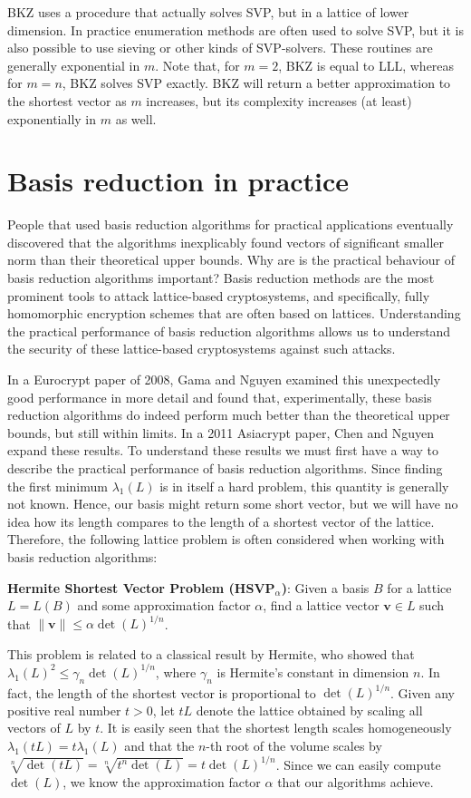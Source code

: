 \documentclass{article}[11pt]
\newcommand{\bfv}{\mathbf{v}}
\begin{document}
BKZ uses a procedure that actually solves SVP, but in a lattice of lower dimension. In practice enumeration methods are often used to solve SVP, but it is also possible to use sieving or other kinds of SVP-solvers. These routines are generally exponential in $m$. Note that, for $m=2$, BKZ is equal to LLL, whereas for $m=n$, BKZ solves SVP exactly. BKZ will return a better approximation to the shortest vector as $m$ increases, but its complexity increases (at least) exponentially in $m$ as well.

\section*{Basis reduction in practice}
People that used basis reduction algorithms for practical applications eventually discovered that the algorithms inexplicably found vectors of significant smaller norm than their theoretical upper bounds. Why are is the practical behaviour of basis reduction algorithms important? Basis reduction methods are the most prominent tools to attack lattice-based cryptosystems, and specifically, fully homomorphic encryption schemes that are often based on lattices. Understanding the practical performance of basis reduction algorithms allows us to understand the security of these lattice-based cryptosystems against such attacks. 

In a Eurocrypt paper of 2008, Gama and Nguyen examined this unexpectedly good performance in more detail and found that, experimentally, these basis reduction algorithms do indeed perform much better than the theoretical upper bounds, but still within limits. In a 2011 Asiacrypt paper, Chen and Nguyen expand these results. To understand these results we must first have a way to describe the practical performance of basis reduction algorithms. Since finding the first minimum $\lambda_1(L)$ is in itself a hard problem, this quantity is generally not known. Hence, our basis might return some short vector, but we will have no idea how its length compares to the length of a shortest vector of the lattice. Therefore, the following lattice problem is often considered when working with basis reduction algorithms:

\vspace{11pt}\noindent\textbf{Hermite Shortest Vector Problem (HSVP$_\alpha$)}: Given a basis $B$ for a lattice $L = L(B)$ and some approximation factor $\alpha$, find a lattice vector $\bfv \in L$ such that $\|\bfv\|\leq \alpha \det(L)^{1/n}$.

\vspace{11pt}\noindent This problem is related to a classical result by Hermite, who showed that $\lambda_1(L)^2 \leq \gamma_n \det(L)^{1/n}$, where $\gamma_n$ is Hermite's constant in dimension $n$. In fact, the length of the shortest vector is proportional to $\det(L)^{1/n}$. Given any positive real number $t>0$, let $tL$ denote the lattice obtained by scaling all vectors of $L$ by $t$. It is easily seen that the shortest length scales homogeneously $\lambda_1(tL) = t\lambda_1(L)$ and that the $n$-th root of the volume scales by $\sqrt[n]{\det(tL)} = \sqrt[n]{t^n\det(L)} = t\det(L)^{1/n}$. Since we can easily compute $\det(L)$, we know the approximation factor $\alpha$ that our algorithms achieve. 
\end{document}
